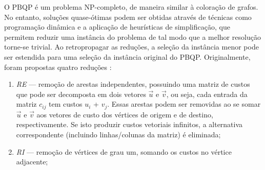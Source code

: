 \documentclass[
	12pt,				%
	openright,			%
	oneside,			%
	a4paper,			%
	tccpreliminar,			%
	]{ABNT-DC-UEL}
\begin{document}
O PBQP é um problema NP-completo, de maneira similar à coloração de grafos. No entanto, soluções quase-ótimas podem ser obtidas através de técnicas como programação dinâmica e a aplicação de heurísticas de simplificação, que permitem reduzir uma instância do problema de tal modo que a melhor resolução torne-se trivial. Ao retropropagar as reduções, a seleção da instância menor pode ser estendida para uma seleção da instância original do PBQP. Originalmente, foram propostas quatro reduções \cite{buchwald:10, eckstein:03}:
\begin{enumerate}
    \item \textit{RE} --- remoção de arestas independentes, possuindo uma matriz de custos que pode ser decomposta em dois vetores $\Vec{u}$ e $\Vec{v}$, ou seja, cada entrada da matriz $c_{ij}$ tem custos $u_i$ + $v_j$. Essas arestas podem ser removidas ao se somar $\Vec{u}$ e $\Vec{v}$ aos vetores de custo dos vértices de origem e de destino, respectivamente. Se isto produzir custos vetoriais infinitos, a alternativa correspondente (incluindo linhas/colunas da matriz) é eliminada;

    \begin{figure}[H]
        \centering
    \end{figure}

    \item \textit{RI} --- remoção de vértices de grau um, somando os custos no vértice adjacente;

    \begin{figure}[H]
        \centering
\end{figure}
\end{enumerate}
\end{document}
